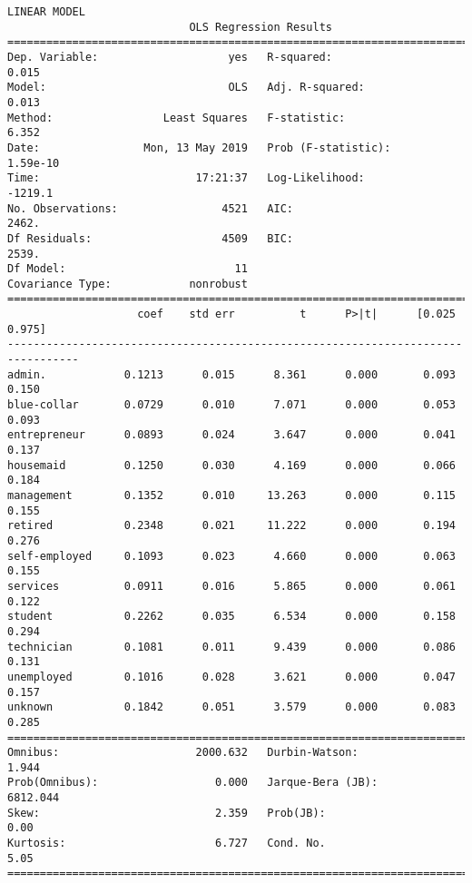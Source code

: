 \documentclass[11pt]{article}
\begin{document}
    \begin{Verbatim}[commandchars=\\\{\}]
LINEAR MODEL
                            OLS Regression Results                            
==============================================================================
Dep. Variable:                    yes   R-squared:                       0.015
Model:                            OLS   Adj. R-squared:                  0.013
Method:                 Least Squares   F-statistic:                     6.352
Date:                Mon, 13 May 2019   Prob (F-statistic):           1.59e-10
Time:                        17:21:37   Log-Likelihood:                -1219.1
No. Observations:                4521   AIC:                             2462.
Df Residuals:                    4509   BIC:                             2539.
Df Model:                          11                                         
Covariance Type:            nonrobust                                         
=================================================================================
                    coef    std err          t      P>|t|      [0.025      0.975]
---------------------------------------------------------------------------------
admin.            0.1213      0.015      8.361      0.000       0.093       0.150
blue-collar       0.0729      0.010      7.071      0.000       0.053       0.093
entrepreneur      0.0893      0.024      3.647      0.000       0.041       0.137
housemaid         0.1250      0.030      4.169      0.000       0.066       0.184
management        0.1352      0.010     13.263      0.000       0.115       0.155
retired           0.2348      0.021     11.222      0.000       0.194       0.276
self-employed     0.1093      0.023      4.660      0.000       0.063       0.155
services          0.0911      0.016      5.865      0.000       0.061       0.122
student           0.2262      0.035      6.534      0.000       0.158       0.294
technician        0.1081      0.011      9.439      0.000       0.086       0.131
unemployed        0.1016      0.028      3.621      0.000       0.047       0.157
unknown           0.1842      0.051      3.579      0.000       0.083       0.285
==============================================================================
Omnibus:                     2000.632   Durbin-Watson:                   1.944
Prob(Omnibus):                  0.000   Jarque-Bera (JB):             6812.044
Skew:                           2.359   Prob(JB):                         0.00
Kurtosis:                       6.727   Cond. No.                         5.05
==============================================================================


\end{Verbatim}
\end{document}
